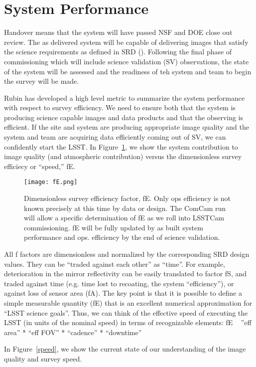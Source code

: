 \section{System Performance}

Handover means that the system will have passed NSF and DOE close out review. The as delivered system will be capable of delivering images that satisfy the science requirements as defined in SRD (\cite{LPM-17}). Following the final phase of commissioning which will include science validation (SV) observations, the state of the system will be assessed and the readiness of teh system and team to begin the survey will be made. 

Rubin has developed a high level metric to summarize the system performance with respect to survey efficiency. We need to ensure both that the system is producing science capable images and data products and that the observing is efficient. 
If the site and system are producing appropriate image quality and the system and team are acquiring data efficiently coming out of SV, we can confidently start the LSST. In Figure~\ref{fE}, we show the system contribution to image quality (and atmospheric contribution) versus the dimensionless survey efficiecy or ``speed,'' fE. 

\begin{figure}%
\texttt{[image: fE.png]}
\caption{Dimensionless survey efficiency factor, fE. Only ops efficiency is not known precisely at this time by data or design. The ComCam run will allow a specific determination of fE as we roll into LSSTCam commissioning. fE will be fully updated by as built system performance and ops. efficiency by the end of science validation.}
\label{fE}
\end{figure}

All f factors are dimensionless and normalized by the corresponding SRD design values. They can be “traded against each other” as “time”.
For example, deterioration in the mirror reflectivity can be easily translated to factor fS, and traded against time (e.g. time lost to recoating, the system “efficiency”), or against loss of sensor area (fA).
The key point is that it is possible to define a simple measurable quantity (fE) that is an excellent numerical approximation for “LSST science goals”. Thus, we can think of the effective speed of executing the LSST (in units of the nominal speed) in terms of recognizable elements: fE ~ ”eff area” * “eff FOV” * “cadence” * “downtime”

In Figure~\ref{speed}, we show the current state of our understanding of the image quality and survey speed.

